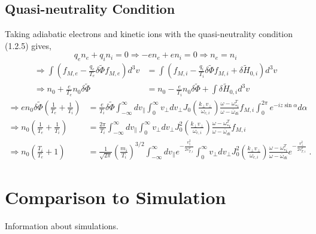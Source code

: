\documentclass[12pt]{article}
\numberwithin{equation}{subsection}
\begin{document}
\subsection{Quasi-neutrality Condition}
   \quad Taking adiabatic electrons and kinetic ions with the quasi-neutrality condition (1.2.5) gives,
   \begin{equation}
      q_e n_e + q_i n_i = 0 \Rightarrow -e n_e + e n_i = 0 \Rightarrow n_e = n_i
   \end{equation}
   \begin{equation}
   \begin{aligned}
      \Rightarrow \int(f_{M,e}-\frac{q_e}{T_e}\delta\widetilde{\Phi}f_{M,e})d^3v
                 &= \int(f_{M,i} - \frac{q_i}{T_i}\delta\widetilde{\Phi}f_{M,i} + \delta\widetilde{H}_{0,i})d^3v \\
      \Rightarrow n_0 + \frac{e}{T_e}n_0\delta\widetilde{\Phi}
                 &= n_0 - \frac{e}{T_i}n_0\delta\widetilde{\Phi} + \int\delta\widetilde{H}_{0,i}d^3v
   \end{aligned}
   \end{equation}
   \begin{equation}
   \begin{aligned}
      \Rightarrow  en_0\delta\widetilde{\Phi}(\frac{1}{T_e} + \frac{1}{T_i})
                &= \frac{e}{T_i}\delta\widetilde{\Phi}\int_{-\infty}^{\infty}dv_\parallel\int_{0}^{\infty}v_\perp dv_\perp
                   J_0(\frac{k_\perp v_\perp}{\omega_{c,i}})\frac{\omega - \omega_{*i}^T}{\omega - \bar{\omega}_{di}}f_{M,i}\int_{0}^{2\pi}e^{-iz\sin\alpha}d\alpha \\
      \Rightarrow n_0(\frac{1}{T_e} + \frac{1}{T_i}) &= \frac{2\pi}{T_i}\int_{-\infty}^{\infty}dv_\parallel\int_{0}^{\infty}v_\perp dv_\perp
                  J_0^2(\frac{k_\perp v_\perp}{\omega_{c,i}})\frac{\omega - \omega_{*i}^T}{\omega - \bar{\omega}_{di}}f_{M,i} \\
      \Rightarrow n_0(\frac{T_i}{T_e} + 1) &= \frac{1}{\sqrt{2\pi}}\left(\frac{m_i}{T_i}\right)^{3/2}\int_{-\infty}^{\infty}dv_\parallel e^{-\frac{v_\parallel^2}{2v^2_{T,i}}}
                  \int_{0}^{\infty}v_\perp dv_\perp J_0^2(\frac{k_\perp v_\perp}{\omega_{c,i}})\frac{\omega - \omega_{*i}^T}{\omega - \bar{\omega}_{di}}e^{-\frac{v_\perp^2}{2v^2_{T,i}}}\;.
   \end{aligned}
   \end{equation}


\section{Comparison to Simulation}
   Information about simulations.
\end{document}
